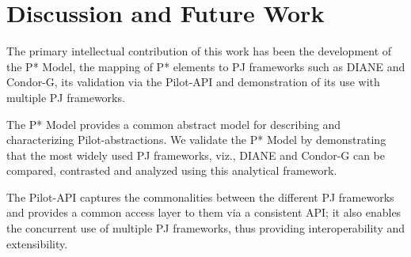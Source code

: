 \documentclass[conference,final]{IEEEtran}
\newcommand{\alnote}[1]{ {\textcolor{blue} { ***andreL: #1 }}}
\newcommand{\alnote}[1]{}
\newcommand{\upp}{\vspace*{-0.5em}}
\begin{document}

\section{Discussion and Future Work \upp\upp}
\label{sec:discussion-future-work}




The primary intellectual contribution of this work has been the
development of the P* Model, the mapping of P* elements to PJ
frameworks such as DIANE and Condor-G, its validation via the
Pilot-API and demonstration of its use with multiple PJ frameworks.
 
The P* Model provides a common abstract model for describing and
characterizing Pilot-abstractions. We validate the P* Model by
demonstrating that the most widely used PJ frameworks, viz., DIANE and
Condor-G can be compared, contrasted and analyzed using this
analytical framework.

The Pilot-API captures the commonalities between the different PJ
frameworks and provides a common access layer to them via a consistent
API; it also enables the concurrent use of multiple PJ frameworks,
thus providing interoperability and extensibility.



\end{document}
